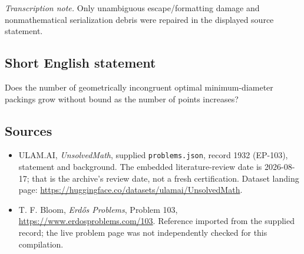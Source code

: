 \documentclass[11pt,a4paper]{article}
\begin{document}
{\small\emph{Transcription note.} Only unambiguous escape/formatting damage and nonmathematical serialization debris were repaired in the displayed source statement.}

\subsection{Short English statement}

Does the number of geometrically incongruent optimal minimum-diameter packings grow without bound as the number of points increases?

\subsection{Sources}

{\small

\begin{itemize}

\item[\hypertarget{source:1932:1}{S1}] ULAM.AI, \emph{UnsolvedMath}, supplied \texttt{problems.json}, record 1932 (EP-103), statement and background. The embedded literature-review date is 2026-08-17; that is the archive’s review date, not a fresh certification. Dataset landing page: \url{https://huggingface.co/datasets/ulamai/UnsolvedMath}.

\item[\hypertarget{source:1932:2}{S2}] T. F. Bloom, \emph{Erdős Problems}, Problem 103, \url{https://www.erdosproblems.com/103}. Reference imported from the supplied record; the live problem page was not independently checked for this compilation.

\end{itemize}

}

\label{end:1932}
\end{document}
